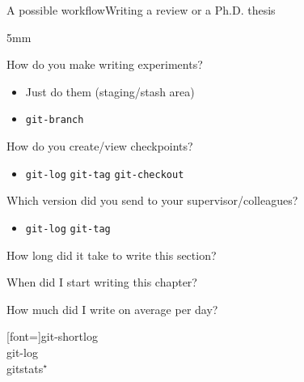 \documentclass[usenames,svgnames,14pt]{beamer}
\begin{document}
\begin{frame}{A possible workflow}{Writing a review or a Ph.D. thesis}
    \begin{customlist}{5mm}
        \item How do you make writing experiments?
              \begin{itemize}
                  \item Just do them (staging/stash area)
                  \item \texttt{git-branch}
              \end{itemize}
        \item How do you create/view checkpoints?
              \begin{itemize}
                  \item \texttt{git-log} \quad \texttt{git-tag} \quad \texttt{git-checkout}
              \end{itemize}
        \item Which version did you send to your supervisor/colleagues?
              \begin{itemize}
                  \item \texttt{git-log} \quad \texttt{git-tag}
              \end{itemize}
        \item How long did it take to write this section?
        \item When did I start writing this chapter?
        \item How much did I write on average per day?
    \end{customlist}
    [font=\ttfamily\small]{git-shortlog\\ git-log\\ gitstats$^\star$}
\end{frame}
\end{document}
